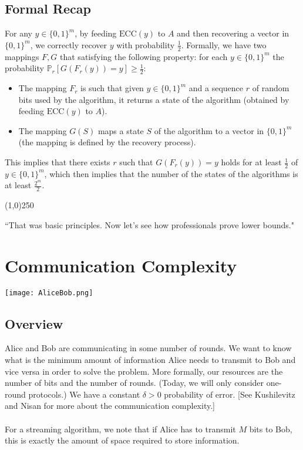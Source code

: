 \documentclass[11pt]{article}
\begin{document}
\subsection{Formal Recap}
For any $y\in \{0,1\}^m$, by feeding $\text{ECC}(y)$ to $A$ and then recovering a vector in $\{0,1\}^m$, we correctly recover $y$ with probability $\frac{1}{2}$. Formally, we have two mappings $F,G$ that satisfying the following property: for each $y \in \{0,1\}^m$ the probability $\mathbb{P}_r[ G(F_r(y))=y] \ge \frac{1}{2}$:

\begin{itemize} 
\item The mapping $F_r$ is such that given $y \in \{0,1\}^m$ and a sequence $r$ of random bits used by the algorithm, it returns a state of the algorithm (obtained by feeding $\text{ECC}(y)$ to $A$). 
\item The mapping $G(S)$ maps a state $S$ of the algorithm to a vector in $\{0,1\}^m$ (the mapping is defined by the recovery process).
\end{itemize}
This implies that there exists $r$ such that $G(F_r(y))=y$ holds for at least $\frac{1}{2}$ of $y \in \{0,1\}^m$, which then implies that the number of the states of the algorithms is at least $\frac{2^m}{2}$.
\begin{center}
\line(1,0){250}
\end{center}

``That was basic principles. Now let's see how professionals prove lower bounds." \section{Communication Complexity}
\begin{center}
\texttt{[image: AliceBob.png]}
\end{center}

\subsection{Overview}
Alice and Bob are communicating in some number of rounds. We want to know what is the minimum amount of information Alice needs to transmit to Bob and vice versa in order to solve the problem. More formally, our resources are the number of bits and the number of rounds. (Today, we will only consider one-round protocols.) We have a constant $\delta > 0$ probability of error. [See Kushilevitz and Nisan \cite{KN} for more about the communication complexity.]
\\
\\
For a streaming algorithm, we note that if Alice has to transmit $M$ bits to Bob, this is exactly the amount of space required to store information.
\end{document}
